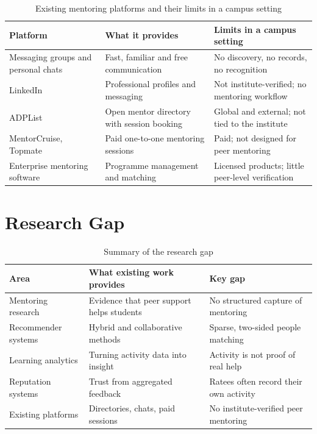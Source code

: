 \documentclass[12pt,a4paper]{report}
\begin{document}
\begin{table}[h]
\centering
\caption{Existing mentoring platforms and their limits in a campus setting}
\label{tab:platforms}
\small
\begin{tabularx}{\textwidth}{>{\raggedright\arraybackslash}p{3.4cm}XX}
\toprule
\textbf{Platform} & \textbf{What it provides} & \textbf{Limits in a campus setting}\\
\midrule
Messaging groups and personal chats & Fast, familiar and free communication & No discovery, no records, no recognition\\
LinkedIn & Professional profiles and messaging & Not institute-verified; no mentoring workflow\\
ADPList & Open mentor directory with session booking & Global and external; not tied to the institute\\
MentorCruise, Topmate & Paid one-to-one mentoring sessions & Paid; not designed for peer mentoring\\
Enterprise mentoring software & Programme management and matching & Licensed products; little peer-level verification\\
\bottomrule
\end{tabularx}
\end{table}

\section{Research Gap}
\begin{table}[h]
\centering
\caption{Summary of the research gap}
\label{tab:gap}
\small
\begin{tabularx}{\textwidth}{>{\raggedright\arraybackslash}p{3.4cm}XX}
\toprule
\textbf{Area} & \textbf{What existing work provides} & \textbf{Key gap}\\
\midrule
Mentoring research & Evidence that peer support helps students & No structured capture of mentoring\\
Recommender systems & Hybrid and collaborative methods & Sparse, two-sided people matching\\
Learning analytics & Turning activity data into insight & Activity is not proof of real help\\
Reputation systems & Trust from aggregated feedback & Ratees often record their own activity\\
Existing platforms & Directories, chats, paid sessions & No institute-verified peer mentoring\\
\bottomrule
\end{tabularx}
\end{table}
\end{document}
